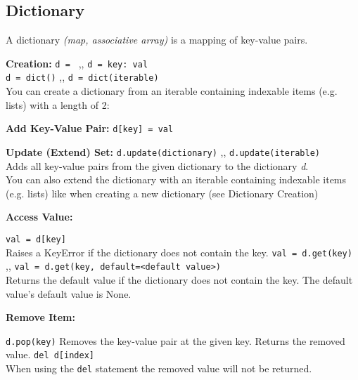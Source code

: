 \subsection{Dictionary}
    A dictionary \textit{(map, associative array)} is a mapping of key-value pairs.

    \begin{indentblock}
        \textbf{Creation:} \texttt{d = {}} \sep{,}
        \texttt{d = {key: val}} \\
        \texttt{d = dict()} \sep{,} \texttt{d = dict(iterable)} \\
        You can create a dictionary from an iterable containing indexable items (e.g. lists)
        with a length of 2:


        \textbf{Add Key-Value Pair:} \texttt{d[key] = val}

        \textbf{Update (Extend) Set:} \texttt{d.update(dictionary)} \sep{,}
        \texttt{d.update(iterable)} \\
        Adds all key-value pairs from the given dictionary to the dictionary
        \textit{d}.\\
        You can also extend the dictionary with an iterable containing indexable items
        (e.g. lists) like when creating a new dictionary (see Dictionary Creation)

        \textbf{Access Value:}
        \begin{itemize}
             \texttt{val = d[key]} \\
            Raises a KeyError if the dictionary does not contain the key.
             \texttt{val = d.get(key)} \sep{,}
            \texttt{val = d.get(key, default=<default value>)} \\
            Returns the default value if the dictionary does not contain the key.
            The default value's default value is None.
        \end{itemize}

        \textbf{Remove Item:}
        \begin{itemize}
             \texttt{d.pop(key)}
            Removes the key-value pair at the given key. Returns the removed value.
             \texttt{del d[index]} \\
            When using the \texttt{del} statement the removed value will not be
            returned.
        \end{itemize}


\end{indentblock}

